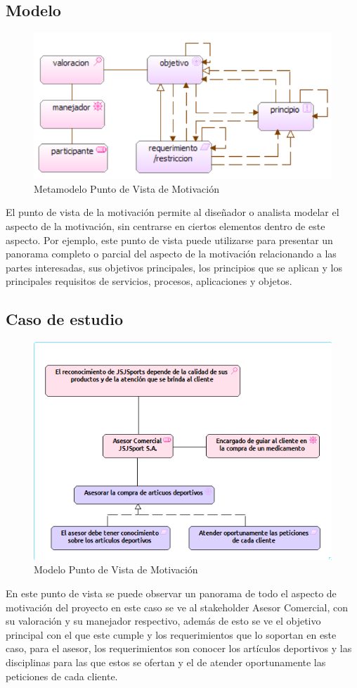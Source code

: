 \subsection{Modelo}
\begin{figure}[th!]
	\centering
	\includegraphics[width=0.7\linewidth]{arquitectura/imagenes/modeloMotivacion}
	\caption{Metamodelo Punto de Vista de Motivación}
	\label{metamodelo motivacion}
\end{figure}
El punto de vista de la motivación permite al diseñador o analista modelar el aspecto de la motivación, sin centrarse en ciertos elementos dentro de este aspecto. Por ejemplo, este punto de vista puede utilizarse para presentar un panorama completo o parcial del aspecto de la motivación relacionando a las partes interesadas, sus objetivos principales, los principios que se aplican y los principales requisitos de servicios, procesos, aplicaciones y objetos.

\subsection{Caso de estudio}

\begin{figure}[th!]
	\centering
	\includegraphics[width=0.7\linewidth]{arquitectura/imagenes/PuntoVistaMotivacion}
	\caption{Modelo Punto de Vista de Motivación}
	\label{modelo motivacion}
\end{figure}


En este punto de vista se puede observar un panorama de todo el aspecto de motivación del proyecto en este caso se ve al stakeholder Asesor Comercial, con su valoración y su manejador respectivo, además de esto se ve el objetivo principal con el que este cumple y los requerimientos que lo soportan en este caso, para el asesor, los requerimientos son conocer los artículos deportivos y las disciplinas para las que estos se ofertan y el de atender oportunamente las peticiones de cada cliente.

\newpage

